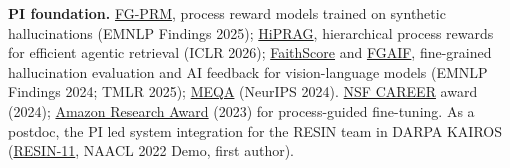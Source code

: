 \documentclass[11pt]{article}
\newcommand{\head}[1]{{\color{navy}\textbf{#1}}\enspace}
\begin{document}
\head{PI foundation.} \href{https://doi.org/10.18653/v1/2025.findings-emnlp.228}{FG-PRM}, process reward models trained on synthetic hallucinations (EMNLP Findings 2025); \href{https://arxiv.org/abs/2510.07794}{HiPRAG}, hierarchical process rewards for efficient agentic retrieval (ICLR 2026); \href{https://doi.org/10.18653/v1/2024.findings-emnlp.290}{FaithScore} and \href{https://arxiv.org/abs/2404.05046}{FGAIF}, fine-grained hallucination evaluation and AI feedback for vision-language models (EMNLP Findings 2024; TMLR 2025); \href{https://proceedings.neurips.cc/paper_files/paper/2024/hash/e560a0b22e4432003d0dba63ff8dc457-Abstract.html}{MEQA} (NeurIPS 2024). \href{https://www.nsf.gov/awardsearch/showAward?AWD_ID=2340435}{NSF CAREER} award (2024); \href{https://www.amazon.science/research-awards/recipients/xinya-du}{Amazon Research Award} (2023) for process-guided fine-tuning. As a postdoc, the PI led system integration for the RESIN team in DARPA KAIROS (\href{https://doi.org/10.18653/v1/2022.naacl-demo.7}{\mbox{RESIN-11}}, NAACL 2022 Demo, first author).
\end{document}

